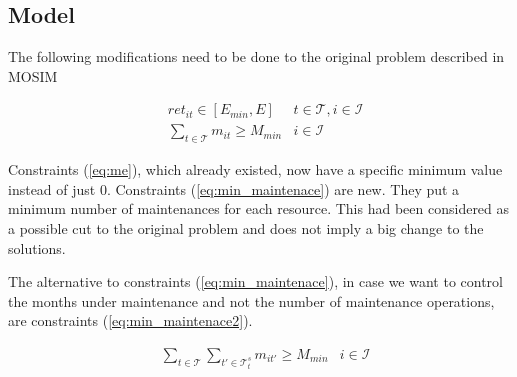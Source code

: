 \documentclass[a4paper,11pt]{article}
\begin{document}
    \subsection{Model}

        The following modifications need to be done to the original problem described in MOSIM
        

        \begin{align}
            & ret_{it} \in [E_{min},E] 
                & t \in \mathcal{T}, i \in \mathcal{I} \label{eq:me}\\
            & \sum_{t \in \mathcal{T}} m_{it} \geq M_{min} 
                & i \in \mathcal{I} \label{eq:min_maintenace}
        \end{align}

        Constraints (\ref{eq:me}), which already existed, now have a specific minimum value instead of just 0. Constraints (\ref{eq:min_maintenace}) are new. They put a minimum number of maintenances for each resource. This had been considered as a possible cut to the original problem and does not imply a big change to the solutions.

        The alternative to constraints (\ref{eq:min_maintenace}), in case we want to control the months under maintenance and not the number of maintenance operations, are constraints (\ref{eq:min_maintenace2}).

        \begin{align}
            & \sum_{t \in \mathcal{T}} \sum_{t' \in \mathcal{T}^{s}_t} m_{it'} \geq M_{min}
                & i \in \mathcal{I} \label{eq:min_maintenace2}\\
        \end{align}

        

\end{document}
